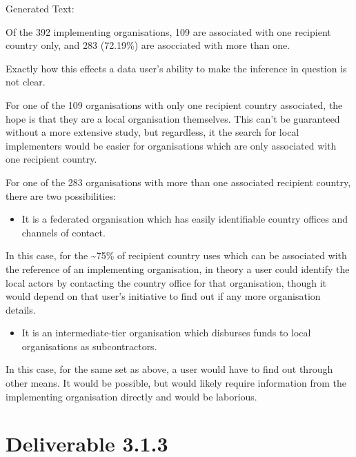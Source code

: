 \documentclass[letterpaper,10pt,english]{sphinxmanual}
\begin{document}
%
\begin{OriginalVerbatim}[commandchars=\\\{\}]
Generated Text:

Of the 392 implementing organisations, 109 are associated with one recipient country only, and 283 (72.19\%) are asocciated with more than one.
\end{OriginalVerbatim}
\relax
Exactly how this effects a data user's ability to make the inference in
question is not clear.

For one of the 109 organisations with only one recipient country
associated, the hope is that they are a local organisation themselves.
This can't be guaranteed without a more extensive study, but regardless,
it the search for local implementers would be easier for organisations
which are only associated with one recipient country.

For one of the 283 organisations with more than one associated recipient
country, there are two possibilities:
\begin{itemize}
\item {} 
It is a federated organisation which has easily identifiable country
offices and channels of contact.

\end{itemize}

In this case, for the \textasciitilde{}75\% of recipient country uses which can be
associated with the reference of an implementing organisation, in theory
a user could identify the local actors by contacting the country office
for that organisation, though it would depend on that user's initiative
to find out if any more organisation details.
\begin{itemize}
\item {} 
It is an intermediate-tier organisation which disburses funds to
local organisations as subcontractors.

\end{itemize}

In this case, for the same set as above, a user would have to find out
through other means. It would be possible, but would likely require
information from the implementing organisation directly and would be
laborious.


\section{Deliverable 3.1.3}
\label{\detokenize{Global Affairs Canada - Compliance Report:Deliverable-3.1.3}}
\end{document}
